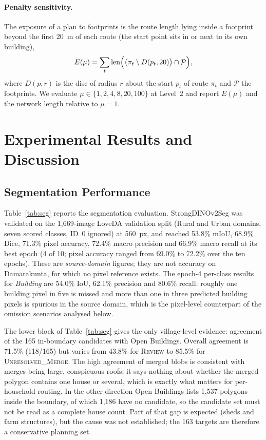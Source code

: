 \documentclass[journal]{IEEEtran}
\begin{document}
\paragraph{Penalty sensitivity.}
The exposure of a plan to footprints is the route length lying inside a footprint beyond the first 20~m of each route (the start point sits in or next to its own building),
\begin{equation}
E(\mu)=\sum_{t}\operatorname{len}\Bigl(\bigl(\pi_t\setminus D(p_t,20)\bigr)\cap\mathcal{P}\Bigr),
\label{eq:expo}
\end{equation}
where $D(p,r)$ is the disc of radius $r$ about the start $p_t$ of route $\pi_t$ and $\mathcal{P}$ the footprints. We evaluate $\mu\in\{1,2,4,8,20,100\}$ at Level~2 and report $E(\mu)$ and the network length relative to $\mu=1$.

\section{Experimental Results and Discussion}\label{sec:results}

\subsection{Segmentation Performance}\label{sec:segres}
Table~\ref{tab:seg} reports the segmentation evaluation. StrongDINOv2Seg was validated on the 1{,}669-image LoveDA validation split (Rural and Urban domains, seven scored classes, ID~0 ignored) at 560~px, and reached 53.8\% mIoU, 68.9\% Dice, 71.3\% pixel accuracy, 72.4\% macro precision and 66.9\% macro recall at its best epoch (4 of 10; pixel accuracy ranged from 69.0\% to 72.2\% over the ten epochs). These are \emph{source-domain} figures; they are not accuracy on Damarakunta, for which no pixel reference exists. The epoch-4 per-class results for \emph{Building} are 54.0\% IoU, 62.1\% precision and 80.6\% recall: roughly one building pixel in five is missed and more than one in three predicted building pixels is spurious in the source domain, which is the pixel-level counterpart of the omission scenarios analysed below. 

The lower block of Table~\ref{tab:seg} gives the only village-level evidence: agreement of the 165 in-boundary candidates with Open Buildings. Overall agreement is 71.5\% (118/165) but varies from 43.8\% for \textsc{Review} to 85.5\% for \textsc{Unresolved\_Merge}. The high agreement of merged blobs is consistent with merges being large, conspicuous roofs; it says nothing about whether the merged polygon contains one house or several, which is exactly what matters for per-household routing. In the other direction Open Buildings lists 1{,}537 polygons inside the boundary, of which 1{,}186 have no candidate, so the candidate set must not be read as a complete house count. Part of that gap is expected (sheds and farm structures), but the cause was not established; the 163 targets are therefore a conservative planning set.
\end{document}
